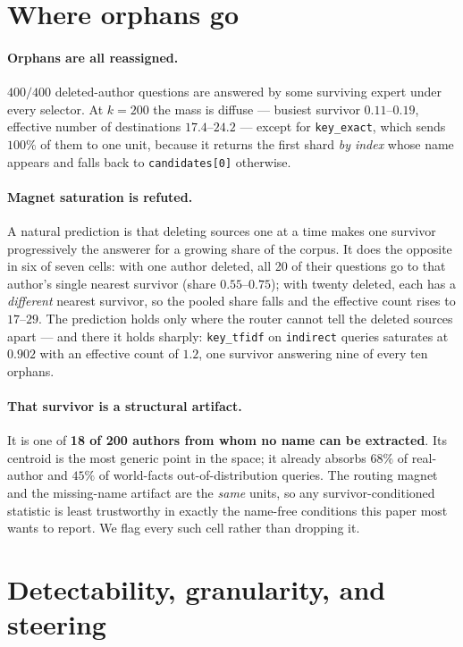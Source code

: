 \documentclass{article}
\begin{document}
\section{Where orphans go}
\label{app:destinations}

\paragraph{Orphans are all reassigned.} $400/400$ deleted-author questions are answered by some
surviving expert under every selector. At $k=200$ the mass is diffuse --- busiest survivor
$0.11$--$0.19$, effective number of destinations $17.4$--$24.2$ --- except for \texttt{key\_exact},
which sends $100\%$ of them to one unit, because it returns the first shard \emph{by index} whose
name appears and falls back to \texttt{candidates[0]} otherwise.

\paragraph{Magnet saturation is refuted.} A natural prediction is that deleting sources one at a
time makes one survivor progressively the answerer for a growing share of the corpus. It does the
opposite in six of seven cells: with one author deleted, all 20 of their questions go to that
author's single nearest survivor (share $0.55$--$0.75$); with twenty deleted, each has a
\emph{different} nearest survivor, so the pooled share falls and the effective count rises to
$17$--$29$. The prediction holds only where the router cannot tell the deleted sources apart --- and
there it holds sharply: \texttt{key\_tfidf} on \texttt{indirect} queries saturates at $0.902$ with
an effective count of $1.2$, one survivor answering nine of every ten orphans.

\paragraph{That survivor is a structural artifact.} It is one of \textbf{18 of 200 authors from whom
no name can be extracted}. Its centroid is the most generic point in the space; it already absorbs
$68\%$ of real-author and $45\%$ of world-facts out-of-distribution queries. The routing magnet and
the missing-name artifact are the \emph{same} units, so any survivor-conditioned statistic is least
trustworthy in exactly the name-free conditions this paper most wants to report. We flag every such
cell rather than dropping it.

\section{Detectability, granularity, and steering}
\label{app:detect}
\end{document}
